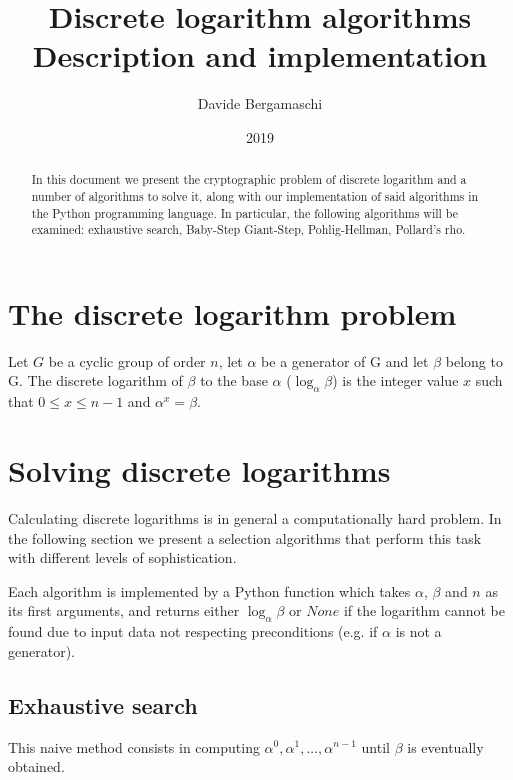 \documentclass[UTF8]{article}
\begin{document}
\title{
    Discrete logarithm algorithms \\
    \large Description and implementation
}
\author{Davide Bergamaschi}
\date{2019}
\maketitle

\begin{abstract}
\noindent In this document we present the cryptographic problem of discrete logarithm and a number of algorithms to solve it, along with our implementation of said algorithms in the Python programming language. In particular, the following algorithms will be examined: exhaustive search, Baby-Step Giant-Step, Pohlig-Hellman, Pollard's rho.
\end{abstract}

\section{The discrete logarithm problem}

Let $G$ be a cyclic group of order $n$, let $\alpha$ be a generator of G and let $\beta$ belong to G. The discrete logarithm of $\beta$ to the base $\alpha$ ($\log_{\alpha}\beta$) is the integer value $x$ such that $0 \leq x \leq n - 1$ and $\alpha^x=\beta$.

\section{Solving discrete logarithms}

Calculating discrete logarithms is in general a computationally hard problem. In the following section we present a selection algorithms that perform this task with different levels of sophistication.

Each algorithm is implemented by a Python function which takes $\alpha$, $\beta$ and $n$ as its first arguments, and returns either $\log_{\alpha}\beta$ or $None$ if the logarithm cannot be found due to input data not respecting preconditions (e.g. if $\alpha$ is not a generator).

\newpage

\subsection{Exhaustive search}

This naive method consists in computing $\alpha^0, \alpha^1, \ldots, \alpha^{n - 1}$ until $\beta$ is eventually obtained.
\end{document}

